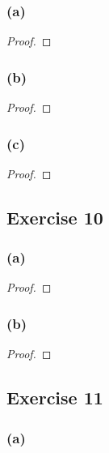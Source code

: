 \documentclass[14pt]{extarticle}
\begin{document}
\subsubsection{(a)}

\begin{proof}

\end{proof}

\subsubsection{(b)}

\begin{proof}

\end{proof}

\subsubsection{(c)}

\begin{proof}

\end{proof}

\subsection{Exercise 10}

\subsubsection{(a)}

\begin{proof}

\end{proof}

\subsubsection{(b)}

\begin{proof}

\end{proof}

\subsection{Exercise 11}

\subsubsection{(a)}
\end{document}
